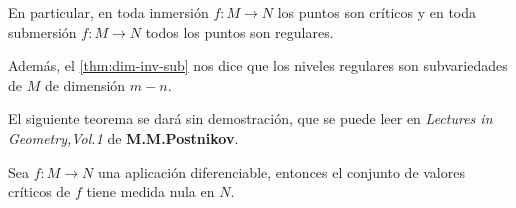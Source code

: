 \documentclass[\main/VD_completo.tex]{subfiles}
\begin{document}
\begin{remark}
En particular, en toda inmersión \(f\colon M\to N\) los puntos son críticos y en
toda submersión \(f\colon M\to N\) todos los puntos son regulares. 


Además, el \cref{thm:dim-inv-sub}
nos dice que los niveles regulares son subvariedades de \(M\) de dimensión \(m-n\).
\end{remark}

El siguiente teorema se dará sin demostración, que se puede leer en
\emph{Lectures in Geometry,Vol.1} de \textbf{M.M.Postnikov}.

\begin{theorem}[name={teorema de Sard}, label={thm:sard}]
Sea \(f\colon M\to N\) una aplicación diferenciable, entonces el conjunto de
valores críticos de \(f\) tiene medida nula en \(N\).
\end{theorem}
\end{document}

